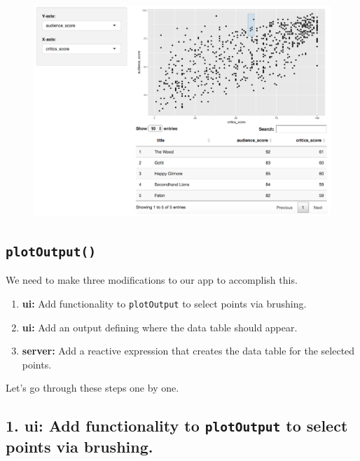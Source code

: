 \documentclass[
  letterpaper,
  DIV=11,
  numbers=noendperiod]{scrreprt}
\providecommand{\tightlist}{%
  \setlength{\itemsep}{0pt}\setlength{\parskip}{0pt}}
\begin{document}
\begin{figure}

{\centering \includegraphics[width=1\textwidth,height=\textheight]{./images/app-brushing.png}

}

\end{figure}

\hypertarget{plotoutput}{%
\subsection{\texorpdfstring{\texttt{plotOutput()}}{plotOutput()}}\label{plotoutput}}

We need to make three modifications to our app to accomplish this.

\begin{enumerate}
\def\labelenumi{\arabic{enumi}.}
\tightlist
\item
  \textbf{ui:} Add functionality to \texttt{plotOutput} to select points
  via brushing.
\item
  \textbf{ui:} Add an output defining where the data table should
  appear.
\item
  \textbf{server:} Add a reactive expression that creates the data table
  for the selected points.
\end{enumerate}

Let's go through these steps one by one.

\hypertarget{ui-add-functionality-to-plotoutput-to-select-points-via-brushing.}{%
\subsection{\texorpdfstring{1. \textbf{ui:} Add functionality to
\texttt{plotOutput} to select points via
brushing.}{1. ui: Add functionality to plotOutput to select points via brushing.}}\label{ui-add-functionality-to-plotoutput-to-select-points-via-brushing.}}
\end{document}
